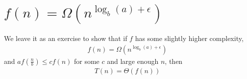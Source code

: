 \documentclass{article}
\begin{document}
\section{$f(n) = \Omega\left(n^{\log_b(a)+\epsilon}\right)$}
\normalsize
We leave it as an exercise to show that if $f$ has some slightly
higher complexity,
\LARGE
\begin{align}
  f(n) = \Omega\left(n^{\log_b(a)+\epsilon}\right)
\end{align}
\normalsize
and $af\left(\frac{n}{b}\right) \leq cf(n)$ for some $c$ and large
enough $n$, then
\LARGE
\begin{align}
  T(n) = \Theta(f(n))
\end{align}
\end{document}

